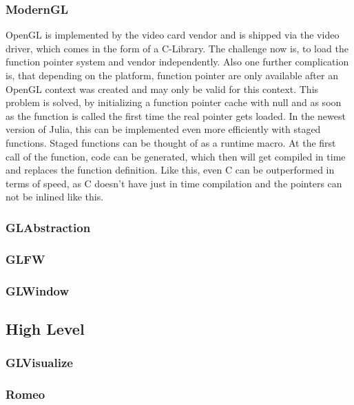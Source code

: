\subsubsection{ModernGL}
OpenGL is implemented by the video card vendor and is shipped via the video driver, which comes in the form of a C-Library.
The challenge now is, to load the function pointer system and vendor independently. Also one further complication is, that depending on the platform, function pointer are only available after an OpenGL context was created and may only be valid for this context. \cite{wgl}
This problem is solved, by initializing a function pointer cache with null and as soon as the function is called the first time the real pointer gets loaded.
In the newest version of Julia, this can be implemented even more efficiently with staged functions. Staged functions can be thought of as a runtime macro.
At the first call of the function, code can be generated, which then will get compiled in time and replaces the function definition.
Like this, even C can be outperformed in terms of speed, as C doesn't have just in time compilation and the pointers can not be inlined like this.


\subsubsection{GLAbstraction}

\subsubsection{GLFW}
\subsubsection{GLWindow}

\subsection{High Level}

\subsubsection{GLVisualize}
\subsubsection{Romeo}
